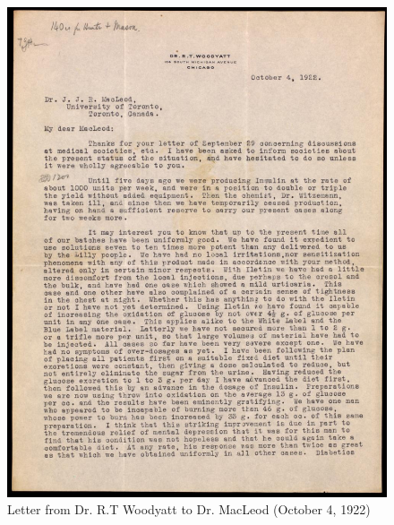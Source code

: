 \documentclass[12pt]{article}
\begin{document}
\begin{figure}[H]
\centering
  \includegraphics [width=5in]{mental_man}
  \caption{Letter from Dr. R.T Woodyatt to Dr. MacLeod (October 4, 1922)}
  \label{fig: Letter from Dr. R. T. Woodyatt to Dr. MacLeod P. 1}
\end{figure}
\end{document}
